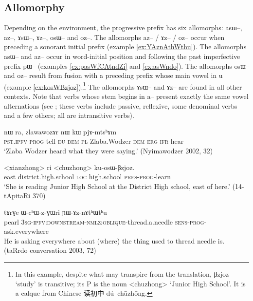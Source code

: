 \documentclass[oldfontcommands,oneside,a4paper,11pt]{article}
\newcommand{\ipa}[1]{{\phon \mbox{#1}}} %
\newcommand{\zh}[1]{{\cn #1}}
\begin{document}
\subsection{Allomorphy} \label{sec:prog.allomorphy}
Depending on the environment, the progressive prefix has six allomorphs: \ipa{asɯ--}, \ipa{az--}, \ipa{ɤsɯ--}, \ipa{ɤz--}, \ipa{osɯ--} and \ipa{oz--}. The allomorphs   \ipa{az--} / \ipa{ɤz--} / \ipa{oz--} occur when preceding a sonorant initial prefix (example \ref{ex:YAznAthWthu}). The allomorphs \ipa{asɯ--} and \ipa{az--} occur in word-initial position and following the past imperfective prefix \ipa{pɯ--} (examples \ref{ex:pasWfCAtndZi} and \ref{ex:asWndo}). The allomorphs \ipa{osɯ--} and \ipa{oz--} result from fusion with a preceding prefix whose main vowel in \ipa{u} (example \ref{ex:kosWBzjoz}).\footnote{In this example, despite what may transpire from the translation, \ipa{βzjoz} `study' is transitive; its P is the noun <chuzhong> `Junior High School'. It is a calque from Chinese \zh{读初中} \ipa{dú chūzhōng}.} The allomorphs \ipa{ɤsɯ--} and \ipa{ɤz--} are found in all other contexts. Note that verbs whose stem begins in \ipa{a--} present exactly the same vowel alternations (see \citealt{jacques07passif}; these verbs include passive, reflexive, some denominal verbs and a few others; all are intransitive verbs).


\begin{exe}
\ex \label{ex:pasWfCAtndZi}
\gll \ipa{pɯ-asɯ-fɕɤt-ndʑi} 	\ipa{nɯ} 	\ipa{ra,} 	\ipa{zlawawozɤr} 	\ipa{nɯ} 	\ipa{kɯ} 	\ipa{pjɤ-mtsʰɤm}\\
\textsc{pst.ipfv-prog}-tell-\textsc{du} \textsc{dem} \textsc{pl}  Zlaba.Wodzer \textsc{dem} \textsc{erg} \textsc{ifr}-hear\\
\glt `Zlaba Wodzer heard what they were saying.' (Nyimawodzer 2002, 32)
\end{exe}

\begin{exe}
\ex \label{ex:kosWBzjoz}
\gll \ipa{akɯ} <xianzhong> \ipa{ri} <chuzhong> \ipa{ku-osɯ-βzjoz}. \\
east district.high.school \textsc{loc} high.school \textsc{pres-prog}-learn \\
\glt `She is reading Junior High School at the District High school, east of here.' (14-tApitaRi 370)
\end{exe}

 \begin{exe}
\ex \label{ex:YAznAthWthu}
\gll
\ipa{tɤrɣe}  	\ipa{ɯ-cʰɯ-z-ɣɯri}  	\ipa{ɲɯ-ɤz-nɤtʰɯtʰu}  	 \\
pearl \textsc{3sg-ipfv:downstream-nmlz:oblique}-thread.a.needle \textsc{sens-prog}-ask.everywhere \\
\glt He is asking everywhere about (where) the thing used to thread needle is. (taRrdo conversation 2003, 72)
\end{exe}
\end{document}
